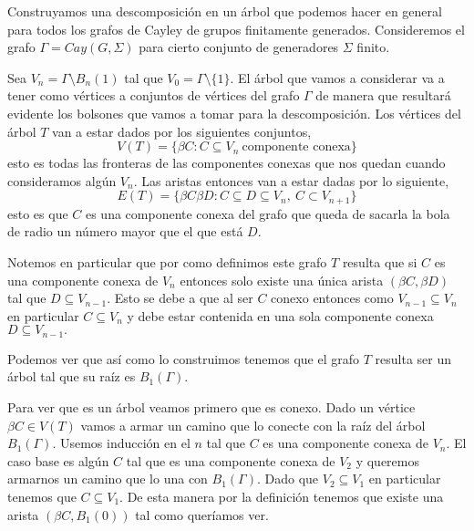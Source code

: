 \documentclass[tesis.tex]{subfiles}
\begin{document}
\begin{ej}\label{desc-grafo-cayley}%
	
	Construyamos una descomposición en un árbol que podemos hacer en general para todos los grafos de Cayley de grupos finitamente generados. 
	Consideremos el grafo $\Gamma = Cay(G,\Sigma)$ para cierto conjunto de generadores $\Sigma$ finito.
	
	Sea $V_n = \Gamma \setminus B_n(1) $ tal que $V_0 = \Gamma \setminus \{1\}$. 
	El árbol que vamos a considerar va a tener como vértices a conjuntos de vértices del grafo $\Gamma$ de manera que resultará evidente los bolsones que vamos a tomar para la descomposición. 
	Los vértices del árbol $T$ van a estar dados por los siguientes conjuntos,
	\[
	V(T) = \{  \beta C : C \subseteq V_n \ \text{componente conexa}   \}
	\]
	esto es todas las fronteras de las componentes conexas que nos quedan cuando consideramos algún $V_n$. 
	Las aristas entonces van a estar dadas por lo siguiente,
	\[
	E(T) = \{ \beta C \beta D : C \subseteq D \subseteq V_n, \ C \subset V_{n+1}   \}
	\]
	esto es que $C$ es una componente conexa del grafo que queda de sacarla la bola de radio un número mayor que el que está $D$.
	
	Notemos en particular que por como definimos este grafo $T$ resulta que si $C$ es una componente conexa de $V_n$ entonces solo existe una única arista $(\beta C, \beta D)$ tal que $D \subseteq V_{n-1}$. 
	Esto se debe a que al ser $C$ conexo entonces como $V_{n-1} \subseteq V_{n}$ en particular $C \subseteq V_{n}$ y debe estar contenida en una sola componente conexa $D \subseteq V_{n-1}.$
	
	
	Podemos ver que así como lo construimos tenemos que el grafo $T$ resulta ser un árbol tal que su raíz es $B_1(\Gamma)$. 
	
	Para ver que es un árbol veamos primero que es conexo. Dado un vértice $\beta C \in V(T)$ vamos a armar un camino que lo conecte con la raíz del árbol $B_1(\Gamma)$. 
	Usemos inducción en el $n$ tal que $C$ es una componente conexa de $V_n$. 
	El caso base es algún $C$ tal que es una componente conexa de $V_2$ y queremos armarnos un camino que lo una con $B_1(\Gamma)$. 
	Dado que $V_2 \subseteq V_1$ en particular tenemos que $C \subseteq V_1$. De esta manera por la definición tenemos que existe una arista $(\beta C, B_1(0))$ tal como queríamos ver.
	

\end{ej}
\end{document}
